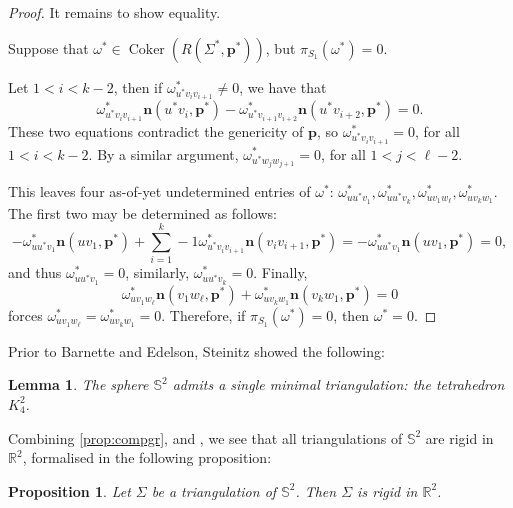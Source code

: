 \documentclass[11pt]{amsart}
\newtheorem{proposition}[theorem]{Proposition}
\newtheorem{lemma}[theorem]{Lemma}
\theoremstyle{definition}
\theoremstyle{remark}
\DeclareMathOperator{\coker}{Coker}
\begin{document}
\begin{proof}
    It remains to show equality.
    
    Suppose that $\omega^*\in\coker(R(\Sigma^*,\mathbf{p}^*))$, but $\pi_{S_1}(\omega^*)=0$.

    Let $1<i<k-2$, then if $\omega_{u^*v_iv_{i+1}}^*\neq 0$, we have that
    \begin{equation}\label{eq:splitind9}
        \omega_{u^*v_iv_{i+1}}^*\mathbf{n}(u^*v_i,\mathbf{p}^*) - \omega_{u^*v_{i+1}v_{i+2}}^*\mathbf{n}(u^*v_{i+2},\mathbf{p}^*) = 0.
    \end{equation}
    These two equations contradict the genericity of $\mathbf{p}$, so $\omega_{u^*v_iv_{i+1}}^*=0$, for all $1<i<k-2$.
    By a similar argument, $\omega_{u^*w_jw_{j+1}}^*=0$, for all $1<j<\ell-2$.

    This leaves four as-of-yet undetermined entries of $\omega^*$: $\omega_{uu^*v_1}^*,\omega_{uu^*v_k}^*,\omega_{uv_1w_{\ell}}^*,\omega_{uv_kw_1}^*$.
    The first two may be determined as follows:
    \begin{equation}
        -\omega_{uu^*v_1}^*\mathbf{n}(uv_1,\mathbf{p}^*) + \sum\limits_{i=1}^k-1\omega_{u^*v_iv_{i+1}}^*\mathbf{n}(v_iv_{i+1},\mathbf{p}^*)
        = -\omega_{uu^*v_1}^*\mathbf{n}(uv_1,\mathbf{p}^*)
        = 0,
    \end{equation}
    and thus $\omega_{uu^*v_1}^*=0$, similarly, $\omega_{uu^*v_k}^*=0$.
    Finally,
    \begin{equation}
        \omega_{uv_1w_{\ell}}^*\mathbf{n}(v_1w_{\ell},\mathbf{p}^*) + \omega_{uv_kw_1}^*\mathbf{n}(v_kw_1,\mathbf{p}^*) = 0
    \end{equation}
    forces $\omega_{uv_1w_{\ell}}^*=\omega_{uv_kw_1}^*=0$.
    Therefore, if $\pi_{S_1}(\omega^*)=0$, then $\omega^*=0$.
\end{proof}

Prior to Barnette and Edelson, Steinitz showed the following:

\begin{lemma}\label{lem:steinitz}\cite{steinitz2013vorlesungen}
    The sphere $\mathbb{S}^2$ admits a single minimal triangulation: the tetrahedron $K_4^2$.
\end{lemma}

Combining \cref{prop:compgr},  and , we see that all triangulations of $\mathbb{S}^2$ are rigid in $\mathbb{R}^2$, formalised in the following proposition:

\begin{proposition}\label{prop:rigs2}
    Let $\Sigma$ be a triangulation of $\mathbb{S}^2$.
    Then $\Sigma$ is rigid in $\mathbb{R}^2$.
\end{proposition}
\end{document}
